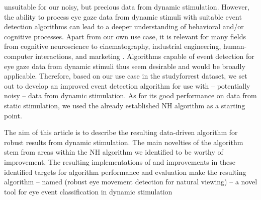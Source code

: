 unsuitable for our noisy, but precious data from dynamic stimulation.
However, the ability to process eye gaze data from dynamic stimuli with suitable event detection algorithms can
lead to a deeper understanding of behavioral and/or cognitive processes. Apart from our own use case, it is
relevant for many fields from  cognitive neuroscience to cinematography, industrial engineering, human-computer
interactions, and marketing \citep{Duchowski2002}. Algorithms capable of event detection for eye gaze data
from dynamic stimuli thus seem desirable and would be broadly applicable. Therefore, based on our use case in the
studyforrest dataset, we set out to develop an improved event detection algorithm for use with -- potentially noisy
-- data from dynamic stimulation. As for its good performance on data from static stimulation, we used the already
established NH algorithm as a starting point.

The aim of this article is to describe the resulting data-driven algorithm for robust results from dynamic
stimulation. The main novelties of the algorithm stem from areas within the NH algorithm we identified to be
worthy of improvement. The resulting implementations of and improvements in these identified targets for algorithm
performance and evaluation make the resulting algorithm -- named \remodnav (robust eye movement detection for
natural
viewing) -- a novel tool for eye event classification in dynamic stimulation

